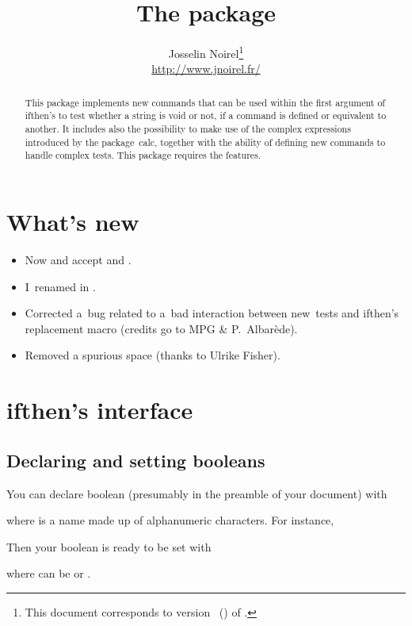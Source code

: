 \documentclass{article}
\title  {The \pack{xifthen} package}
\author {Josselin Noirel\footnote{This document corresponds to version
  \fileversion\ (\filedate) of \pack{\filename}.}\\\url{http://www.jnoirel.fr/}}
\makeatletter
\newcommand*{\1}{$_1\m@th$}
\newcommand*{\2}{$_2\m@th$}
\newcommand*{\pack}{\textsf}
\makeatother
\begin{document}
\maketitle

\begin{abstract}
  This package implements new commands that can be used within the
  first argument of \pack{ifthen}'s  to test whether a
  string is void or not, if a command is defined or equivalent to
  another.  It includes also the possibility to make use of the
  complex expressions introduced by the package~\pack{calc}, together
  with the ability of defining new commands to handle complex tests.
  This package requires the \eTeX{} features.
\end{abstract}

\tableofcontents

\section{What's new}

\begin{itemize}
\item [1.1] Now  and  accept \tex{<=} and \tex{>=}.
\item I~renamed  in .

\addvspace{\baselineskip}

\item [1.2] Corrected a~bug related to a~bad interaction between
  new~tests and ifthen's replacement macro (credits go to MPG \&
  P.~Albar\`ede).

\addvspace{\baselineskip}

\item [1.3] Removed a spurious space (thanks to Ulrike Fisher).
\end{itemize}

\section{\pack{ifthen}'s interface}

\subsection{Declaring and setting booleans}

You can declare boolean (presumably in the preamble of your document) with
%
\begin{texcode}
\end{texcode}
%
where  is a name made up of alphanumeric characters.
For instance, 
%
\begin{texcode}
 \newline
{}
\end{texcode}
%
Then your boolean is ready to be set with
%
\begin{texcode}
\end{texcode}
%
where  can be  or .
\end{document}
